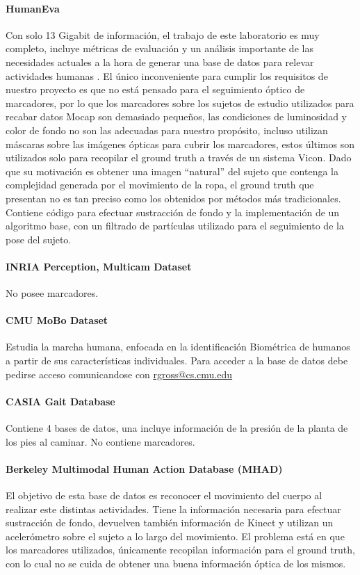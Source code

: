 \paragraph{HumanEva \cite{humaneva}}
Con solo 13 Gigabit de información, el trabajo de este laboratorio es muy completo, incluye métricas de evaluación y un análisis importante de las necesidades actuales a la hora de generar una base de datos para relevar actividades humanas . El único inconveniente para cumplir los requisitos de nuestro proyecto es que no está pensado para el seguimiento óptico de marcadores, por lo que los marcadores sobre los sujetos de estudio utilizados para recabar datos Mocap son demasiado pequeños, las condiciones de luminosidad y color de fondo no son las adecuadas para nuestro propósito, incluso utilizan máscaras sobre las imágenes ópticas para cubrir los marcadores, estos últimos son utilizados solo para recopilar el ground truth a través de un sistema Vicon.  Dado que su motivación es obtener una imagen ``natural'' del sujeto que contenga la complejidad generada por el movimiento de la ropa, el ground truth que presentan  no es tan preciso como los obtenidos por métodos más tradicionales.  Contiene código para efectuar sustracción de fondo y la implementación de un algoritmo base, con un filtrado de partículas utilizado para el seguimiento de la pose del sujeto.  

\paragraph{INRIA Perception, Multicam Dataset}
No posee marcadores. 

\paragraph{CMU MoBo Dataset}
Estudia la marcha humana, enfocada en la identificación Biométrica de humanos a partir de sus características individuales. Para acceder a la base de datos debe pedirse acceso comunicandose con \textcolor{blue}{\underline{\url{rgross@cs.cmu.edu }}}

\paragraph{CASIA Gait Database} 
Contiene 4 bases de datos, una incluye información de la presión de la planta de los pies al caminar. No contiene marcadores.

\paragraph{Berkeley Multimodal Human Action Database (MHAD)}
El objetivo de esta base de datos es reconocer el movimiento del cuerpo al realizar este distintas actividades. Tiene la información necesaria para efectuar sustracción de fondo, devuelven también información de Kinect y utilizan un acelerómetro sobre el sujeto a lo largo del movimiento. El problema está en que los marcadores utilizados, únicamente recopilan información para el ground truth, con lo cual no se cuida de obtener una buena información óptica de los mismos.


